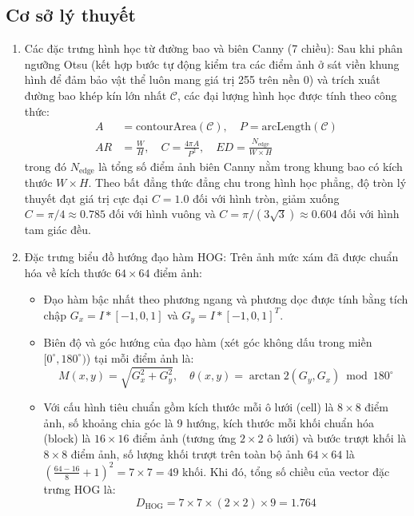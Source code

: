 \documentclass[12pt,a4paper]{article}
\begin{document}
\subsection{Cơ sở lý thuyết}
\begin{enumerate}
    \item Các đặc trưng hình học từ đường bao và biên Canny (7 chiều): Sau khi phân ngưỡng Otsu (kết hợp bước tự động kiểm tra các điểm ảnh ở sát viền khung hình để đảm bảo vật thể luôn mang giá trị 255 trên nền 0) và trích xuất đường bao khép kín lớn nhất $\mathcal{C}$, các đại lượng hình học được tính theo công thức:
    \begin{align}
        A &= \text{contourArea}(\mathcal{C}), \quad P = \text{arcLength}(\mathcal{C}) \\
        AR &= \frac{W}{H}, \quad C = \frac{4\pi A}{P^2}, \quad ED = \frac{N_{\text{edge}}}{W \times H}
    \end{align}
    trong đó $N_{\text{edge}}$ là tổng số điểm ảnh biên Canny nằm trong khung bao có kích thước $W \times H$. Theo bất đẳng thức đẳng chu trong hình học phẳng, độ tròn lý thuyết đạt giá trị cực đại $C = 1.0$ đối với hình tròn, giảm xuống $C = \pi/4 \approx 0.785$ đối với hình vuông và $C = \pi/(3\sqrt{3}) \approx 0.604$ đối với hình tam giác đều.
    \item Đặc trưng biểu đồ hướng đạo hàm HOG: Trên ảnh mức xám đã được chuẩn hóa về kích thước $64 \times 64$ điểm ảnh:
    \begin{itemize}
        \item Đạo hàm bậc nhất theo phương ngang và phương dọc được tính bằng tích chập $G_x = I * [-1, 0, 1]$ và $G_y = I * [-1, 0, 1]^T$.
        \item Biên độ và góc hướng của đạo hàm (xét góc không dấu trong miền $[0^\circ, 180^\circ)$) tại mỗi điểm ảnh là:
        \begin{equation}
            M(x, y) = \sqrt{G_x^2 + G_y^2}, \quad \theta(x, y) = \arctan2(G_y, G_x) \bmod 180^\circ
        \end{equation}
        \item Với cấu hình tiêu chuẩn gồm kích thước mỗi ô lưới (cell) là $8 \times 8$ điểm ảnh, số khoảng chia góc là 9 hướng, kích thước mỗi khối chuẩn hóa (block) là $16 \times 16$ điểm ảnh (tương ứng $2 \times 2$ ô lưới) và bước trượt khối là $8 \times 8$ điểm ảnh, số lượng khối trượt trên toàn bộ ảnh $64 \times 64$ là $\left(\frac{64-16}{8} + 1\right)^2 = 7 \times 7 = 49$ khối. Khi đó, tổng số chiều của vector đặc trưng HOG là:
        \begin{equation}
            D_{\text{HOG}} = 7 \times 7 \times (2 \times 2) \times 9 = 1.764
        \end{equation}
    \end{itemize}
\end{enumerate}
\end{document}
